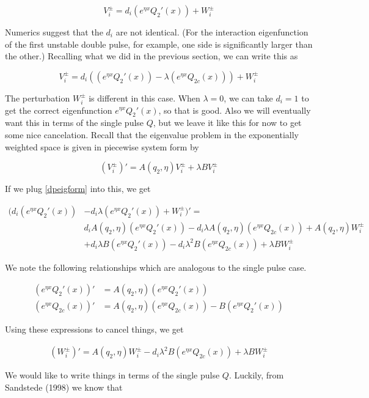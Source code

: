 \documentclass[12pt]{article}
\begin{document}
\[
V_i^\pm = d_i (e^{\eta x}Q_2'(x)) + W_i^\pm 
\]

Numerics suggest that the $d_i$ are not identical. (For the interaction eigenfunction of the first unstable double pulse, for example, one side is significantly larger than the other.) Recalling what we did in the previous section, we can write this as

\begin{equation}\label{dpeigform}
V_i^\pm = d_i( (e^{\eta x}Q_2'(x)) - \lambda (e^{\eta x}Q_{2c}(x)) ) + W_i^\pm
\end{equation}

The perturbation $W_i^\pm$ is different in this case. When $\lambda = 0$, we can take $d_i = 1$ to get the correct eigenfunction $e^{\eta x}Q_2'(x)$, so that is good. Also we will eventually want this in terms of the single pulse $Q$, but we leave it like this for now to get some nice cancelation. Recall that the eigenvalue problem in the exponentially weighted space is given in piecewise system form by

\[
(V_i^\pm)' = A(q_2, \eta)V_i^\pm + \lambda B V_i^\pm
\]

If we plug \eqref{dpeigform} into this, we get 

\begin{align*}
(d_i (e^{\eta x}Q_2'(x)) &- d_i \lambda (e^{\eta x}Q_2'(x)) + W_i^\pm)' = \\
& d_i A(q_2, \eta) (e^{\eta x}Q_2'(x)) - d_i \lambda A(q_2, \eta)(e^{\eta x}Q_{2c}(x))
+ A(q_2, \eta) W_i^\pm \\
&+ d_i \lambda B (e^{\eta x}Q_2'(x)) - d_i \lambda^2 B (e^{\eta x}Q_{2c}(x)) 
+ \lambda B W_i^\pm 
\end{align*}

We note the following relationships which are analogous to the single pulse case.

\begin{align*}
(e^{\eta x}Q_2'(x))' &= A(q_2,\eta)(e^{\eta x}Q_2'(x)) \\
(e^{\eta x}Q_{2c}(x))' &= A(q_2, \eta)(e^{\eta x}Q_{2c}(x)) - B (e^{\eta x}Q_2'(x))  
\end{align*} 


Using these expressions to cancel things, we get

\begin{align*}
(W_i^\pm)' = A(q_2, \eta) W_i^\pm - d_i \lambda^2 B (e^{\eta x}Q_{2c}(x)) 
+ \lambda B W_i^\pm 
\end{align*}

We would like to write things in terms of the single pulse $Q$. Luckily, from Sandstede (1998) we know that
\end{document}
